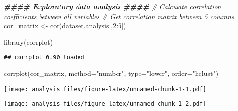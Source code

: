 \documentclass[
]{article}
\newenvironment{Shaded}{\begin{snugshade}}{\end{snugshade}}
\newcommand{\AttributeTok}[1]{\textcolor[rgb]{0.77,0.63,0.00}{#1}}
\newcommand{\CommentTok}[1]{\textcolor[rgb]{0.56,0.35,0.01}{\textit{#1}}}
\newcommand{\DecValTok}[1]{\textcolor[rgb]{0.00,0.00,0.81}{#1}}
\newcommand{\DocumentationTok}[1]{\textcolor[rgb]{0.56,0.35,0.01}{\textbf{\textit{#1}}}}
\newcommand{\FunctionTok}[1]{\textcolor[rgb]{0.00,0.00,0.00}{#1}}
\newcommand{\NormalTok}[1]{#1}
\newcommand{\OtherTok}[1]{\textcolor[rgb]{0.56,0.35,0.01}{#1}}
\newcommand{\SpecialCharTok}[1]{\textcolor[rgb]{0.00,0.00,0.00}{#1}}
\newcommand{\StringTok}[1]{\textcolor[rgb]{0.31,0.60,0.02}{#1}}
\begin{document}
\begin{Shaded}
\begin{Highlighting}[]
\DocumentationTok{\#\#\#\# Exploratory data analysis \#\#\#\#}
\CommentTok{\# Calculate correlation coefficients between all variables}
\CommentTok{\# Get correlation matrix between 5 columns }
\NormalTok{cor\_matrix }\OtherTok{\textless{}{-}} \FunctionTok{cor}\NormalTok{(dataset.analysis[,}\DecValTok{2}\SpecialCharTok{:}\DecValTok{6}\NormalTok{])}

\FunctionTok{library}\NormalTok{(corrplot)}
\end{Highlighting}
\end{Shaded}

\begin{verbatim}
## corrplot 0.90 loaded
\end{verbatim}

\begin{Shaded}
\begin{Highlighting}[]
\FunctionTok{corrplot}\NormalTok{(cor\_matrix, }\AttributeTok{method=}\StringTok{"number"}\NormalTok{, }\AttributeTok{type=}\StringTok{"lower"}\NormalTok{, }\AttributeTok{order=}\StringTok{"hclust"}\NormalTok{)}
\end{Highlighting}
\end{Shaded}

\texttt{[image: analysis\_files/figure-latex/unnamed-chunk-1-1.pdf]}

\begin{Shaded}
\end{Shaded}

\texttt{[image: analysis\_files/figure-latex/unnamed-chunk-1-2.pdf]}

\begin{Shaded}
\end{Shaded}
\end{document}
